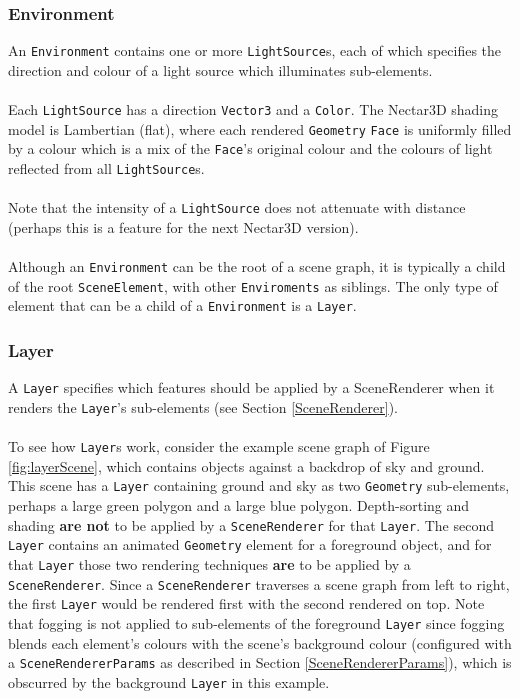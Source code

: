 \documentclass[10pt,aps, prb,preprint]{article}
\begin{document}
\subsubsection{Environment}
An \texttt{Environment} contains one or more \texttt{LightSource}s, each of which specifies the direction and colour of a light source which illuminates sub-elements.
\\
\\
Each \texttt{LightSource} has a direction \texttt{Vector3} and a \texttt{Color}. The Nectar3D shading model is Lambertian (flat), where each rendered \texttt{Geometry} \texttt{Face} is uniformly filled by a colour which is a mix of the \texttt{Face}'s original colour and the colours of light reflected from all \texttt{LightSource}s.
\\
\\
Note that the intensity of a \texttt{LightSource} does not attenuate with distance (perhaps this is a feature for the next Nectar3D version).
\\
\\
Although an \texttt{Environment} can be the root of a scene graph, it is typically a child of the root \texttt{SceneElement}, with other \texttt{Enviroments} as siblings. The only type of element that can be a child of a \texttt{Environment} is a \texttt{Layer}.



\subsubsection{Layer}
A \texttt{Layer} specifies which features should be applied by a SceneRenderer when it renders the \texttt{Layer}'s sub-elements (see Section \ref{SceneRenderer}).
\\
\\
To see how \texttt{Layer}s work, consider the example scene graph of Figure \ref{fig:layerScene}, which contains objects against a backdrop of sky and ground. This scene has a \texttt{Layer} containing ground and sky as two \texttt{Geometry} sub-elements, perhaps a large green polygon and a large blue polygon. Depth-sorting and shading \textbf{are not} to be applied by a \texttt{SceneRenderer} for that \texttt{Layer}. The second \texttt{Layer} contains an animated \texttt{Geometry} element for a foreground object, and for that \texttt{Layer} those two rendering techniques \textbf{are} to be applied by a \texttt{SceneRenderer}. Since a \texttt{SceneRenderer} traverses a scene graph from left to right, the first \texttt{Layer} would be rendered first with the second rendered on top. Note that fogging is not applied to sub-elements of the foreground \texttt{Layer} since fogging blends each element's colours with the scene's background colour (configured with a \texttt{SceneRendererParams} as described in Section \ref{SceneRendererParams}), which is obscurred by the background \texttt{Layer} in this example.
\end{document}
